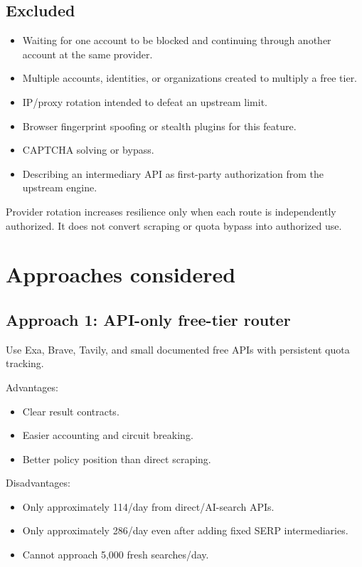 \documentclass[11pt]{article}
\begin{document}
\subsection*{Excluded}
\label{sec:org8b7300d}

\begin{itemize}
\item Waiting for one account to be blocked and continuing through another account
at the same provider.
\item Multiple accounts, identities, or organizations created to multiply a free
tier.
\item IP/proxy rotation intended to defeat an upstream limit.
\item Browser fingerprint spoofing or stealth plugins for this feature.
\item CAPTCHA solving or bypass.
\item Describing an intermediary API as first-party authorization from the upstream
engine.
\end{itemize}

Provider rotation increases resilience only when each route is independently
authorized.  It does not convert scraping or quota bypass into authorized use.
\section*{Approaches considered}
\label{sec:orga131658}

\subsection*{Approach 1: API-only free-tier router}
\label{sec:org3f68652}

Use Exa, Brave, Tavily, and small documented free APIs with persistent quota
tracking.

Advantages:

\begin{itemize}
\item Clear result contracts.
\item Easier accounting and circuit breaking.
\item Better policy position than direct scraping.
\end{itemize}

Disadvantages:

\begin{itemize}
\item Only approximately 114/day from direct/AI-search APIs.
\item Only approximately 286/day even after adding fixed SERP intermediaries.
\item Cannot approach 5,000 fresh searches/day.
\end{itemize}
\end{document}
